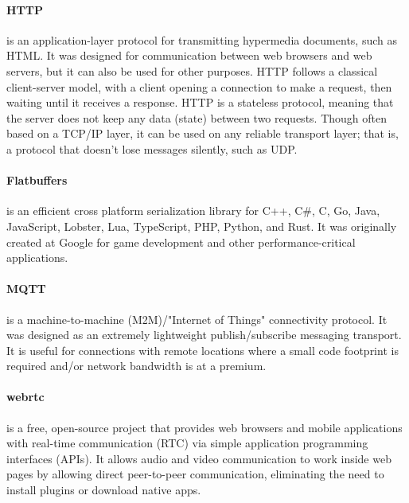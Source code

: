 \paragraph{HTTP}
is an application-layer protocol for transmitting hypermedia documents, such as HTML.
It was designed for communication between web browsers and web servers, but it can also be used for other purposes.
HTTP follows a classical client-server model, with a client opening a connection to make a request,
then waiting until it receives a response.
HTTP is a stateless protocol, meaning that the server does not keep any data (state) between two requests.
Though often based on a TCP/IP layer, it can be used on any reliable transport layer;
that is, a protocol that doesn't lose messages silently, such as UDP.

\paragraph{Flatbuffers}
is an efficient cross platform serialization library for C++, C\#, C, Go, Java, JavaScript, Lobster, Lua, TypeScript, PHP, Python, and Rust.
It was originally created at Google for game development and other performance-critical applications.

\paragraph{MQTT}
is a machine-to-machine (M2M)/"Internet of Things" connectivity protocol.
It was designed as an extremely lightweight publish/subscribe messaging transport.
It is useful for connections with remote locations where a small code footprint is required and/or network bandwidth is at a premium.

\paragraph{webrtc}
is a free, open-source project that provides web browsers and mobile applications with real-time communication (RTC) via simple application programming interfaces (APIs).
It allows audio and video communication to work inside web pages by allowing direct peer-to-peer communication,
eliminating the need to install plugins or download native apps.

